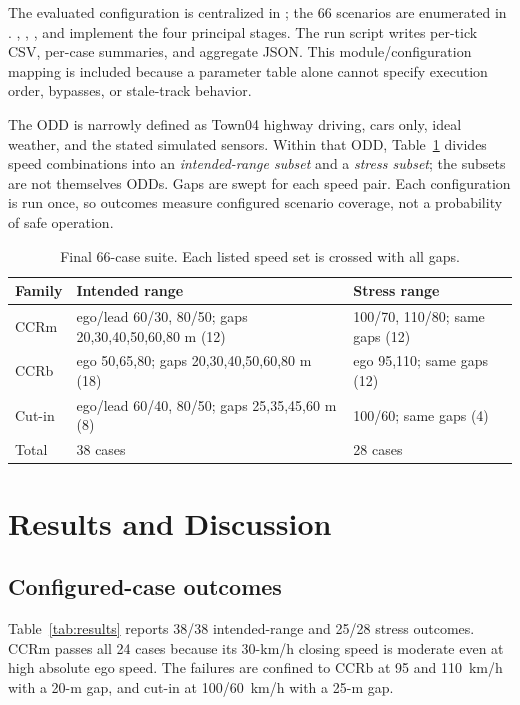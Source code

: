\documentclass[conference]{IEEEtran}
\begin{document}
The evaluated configuration is centralized in
; the 66 scenarios are enumerated in
.
, ,
, and  implement the four
principal stages. The run script writes per-tick CSV, per-case summaries,
and aggregate JSON. This module/configuration mapping is included because a
parameter table alone cannot specify execution order, bypasses, or stale-track
behavior.

The ODD is narrowly defined as Town04 highway driving, cars only, ideal weather,
and the stated simulated sensors. Within that ODD, Table~\ref{tab:suite} divides
speed combinations into an \emph{intended-range subset} and a
\emph{stress subset}; the subsets are not themselves ODDs. Gaps are swept for
each speed pair. Each configuration is run once, so outcomes measure configured
scenario coverage, not a probability of safe operation.

\begin{table}[t]
\caption{Final 66-case suite. Each listed speed set is crossed with all gaps.}
\label{tab:suite}
\centering
\scriptsize
\begin{tabular}{p{}p{}p{}}
\toprule
Family & Intended range & Stress range \\
\midrule
CCRm & ego/lead 60/30, 80/50; gaps 20,30,40,50,60,80 m (12) & 100/70, 110/80; same gaps (12) \\
CCRb & ego 50,65,80; gaps 20,30,40,50,60,80 m (18) & ego 95,110; same gaps (12) \\
Cut-in & ego/lead 60/40, 80/50; gaps 25,35,45,60 m (8) & 100/60; same gaps (4) \\
\midrule
Total & 38 cases & 28 cases \\
\bottomrule
\end{tabular}
\end{table}

\section{Results and Discussion}
\subsection{Configured-case outcomes}
Table~\ref{tab:results} reports 38/38 intended-range and 25/28 stress outcomes.
CCRm passes all 24 cases because its 30-km/h closing speed is moderate even at
high absolute ego speed. The failures are confined to CCRb at 95 and 110~km/h
with a 20-m gap, and cut-in at 100/60~km/h with a 25-m gap.
\end{document}
